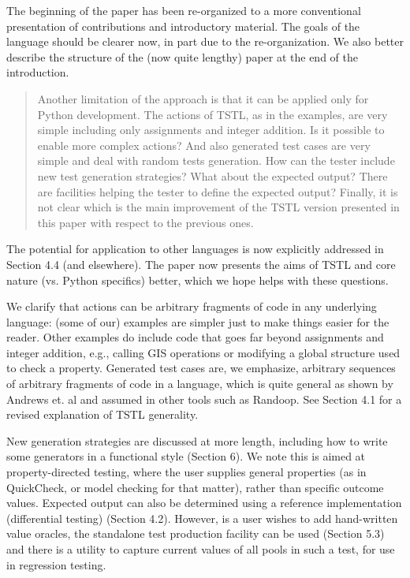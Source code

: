 \documentclass{article}[12pt]
\begin{document}
The beginning of the paper has been re-organized to a more conventional presentation of contributions and introductory material.  The goals of the language should be clearer now, in part due to the re-organization.  We also better describe the structure of the (now quite lengthy) paper at the end of the introduction.


\begin{quote}
Another limitation of the 
approach is that it can be applied only for Python development. The actions of TSTL, 
as in the examples, are very simple including only assignments and integer addition. Is 
it possible to enable more complex actions? And also generated test cases are very 
simple and deal with random tests generation. How can the tester include new test 
generation strategies? What about the expected output? There are facilities helping the 
tester to define the expected output? Finally, it is not clear which is the main 
improvement of the TSTL version presented in this paper with respect to the previous 
ones.
\end{quote}

The potential for application to other languages is now explicitly addressed in Section 4.4 (and elsewhere).  The paper now presents the aims of TSTL and core nature (vs. Python specifics) better, which we hope helps with these questions.

We clarify that actions can be arbitrary fragments of code in any underlying language: (some of our) examples are simpler just to make things easier for the reader.  Other examples do include code that goes far beyond assignments and integer addition, e.g., calling GIS operations or modifying a global structure used to check a property.  Generated test cases are, we emphasize, arbitrary sequences of arbitrary fragments of code in a language, which is quite general as shown by Andrews et. al and assumed in other tools such as Randoop.  See Section 4.1 for a revised explanation of TSTL generality.

New generation strategies are discussed at more length, including how to write some generators in a functional style (Section 6).  We note this is aimed at property-directed testing, where the user supplies general properties (as in QuickCheck, or model checking for that matter), rather than specific outcome values.  Expected output can also be determined using a reference implementation (differential testing) (Section 4.2).  However, is a user wishes to add hand-written value oracles, the standalone test production facility can be used (Section 5.3) and there is a utility to capture current values of all pools in such a test, for use in regression testing.  
\end{document}
